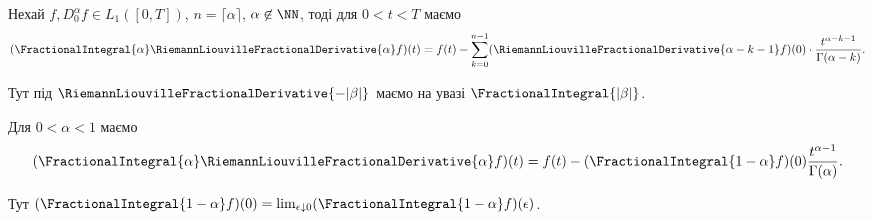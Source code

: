 \begin{proposition}
    Нехай $f, D_0^\alpha f \in L_1([0,T])$, $n = \lceil \alpha \rceil$, $\alpha \not\in \NN$, тоді для $0 < t < T$ маємо
    \begin{equation}
        (\FractionalIntegral{\alpha} \RiemannLiouvilleFractionalDerivative{\alpha} f)(t) = f(t) - \sum_{k = 0}^{n - 1} (\RiemannLiouvilleFractionalDerivative{\alpha - k  - 1} f)(0) \cdot \frac{t^{\alpha - k - 1}}{\Gamma(\alpha - k)}.
    \end{equation}
\end{proposition}
\begin{remark}
    Тут під $\RiemannLiouvilleFractionalDerivative{-|\beta|}$ маємо на увазі $\FractionalIntegral{|\beta|}$.
\end{remark}
\begin{example}
    Для $0 < \alpha < 1$ маємо
    \begin{equation}
        (\FractionalIntegral{\alpha} \RiemannLiouvilleFractionalDerivative{\alpha} f)(t) = f(t) - (\FractionalIntegral{1 - \alpha} f)(0) \frac{t^{\alpha - 1}}{\Gamma(\alpha)}.
    \end{equation}
\end{example}
\begin{remark}
    Тут $(\FractionalIntegral{1 - \alpha} f)(0) = \lim_{\epsilon \downarrow 0} (\FractionalIntegral{1 - \alpha} f)(\epsilon)$.
\end{remark}
